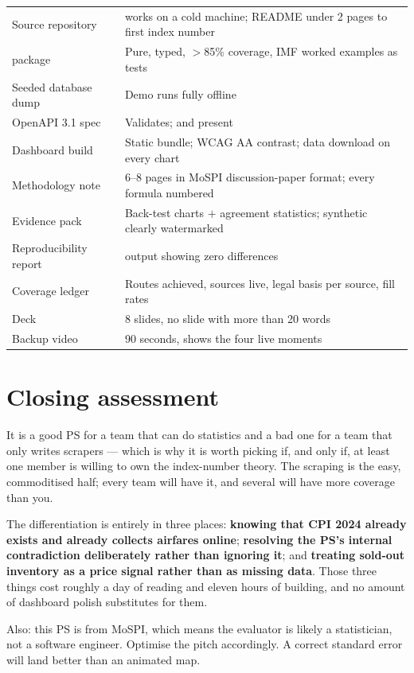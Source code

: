 \begin{center}
\footnotesize
\begin{tabularx}{\textwidth}{@{}L{4.4cm} X@{}}
\toprule
{} &  \\
\midrule
Source repository &  works on a cold machine; README under 2 pages to first index number \\
 package & Pure, typed, $>$85\% coverage, IMF worked examples as tests \\
Seeded database dump & Demo runs fully offline \\
OpenAPI 3.1 spec & Validates;  and  present \\
Dashboard build & Static bundle; WCAG AA contrast; data download on every chart \\
Methodology note & 6--8 pages in MoSPI discussion-paper format; every formula numbered \\
Evidence pack & Back-test charts $+$ agreement statistics; synthetic clearly watermarked \\
Reproducibility report &  output showing zero differences \\
Coverage ledger & Routes achieved, sources live, legal basis per source, fill rates \\
Deck & 8 slides, no slide with more than 20 words \\
Backup video & 90 seconds, shows the four live moments \\
\bottomrule
\end{tabularx}
\end{center}

\section{Closing assessment}

\begin{warnbox}
 It is a good PS for a team that can do
statistics and a bad one for a team that only writes scrapers --- which is why it is worth
picking if, and only if, at least one member is willing to own the index-number theory. The
scraping is the easy, commoditised half; every team will have it, and several will have more
coverage than you.

The differentiation is entirely in three places: \textbf{knowing that CPI 2024 already exists
and already collects airfares online}; \textbf{resolving the PS's internal contradiction
deliberately rather than ignoring it}; and \textbf{treating sold-out inventory as a price
signal rather than as missing data}. Those three things cost roughly a day of reading and
eleven hours of building, and no amount of dashboard polish substitutes for them.

Also: this PS is from MoSPI, which means the evaluator is likely a statistician, not a
software engineer. Optimise the pitch accordingly. A correct standard error will land better
than an animated map.
\end{warnbox}

